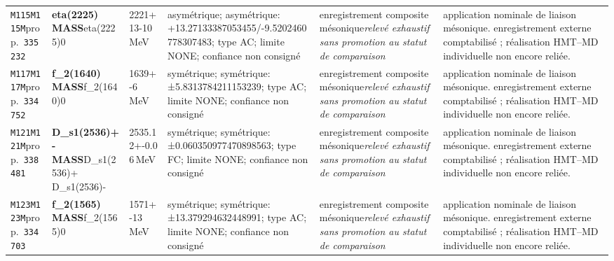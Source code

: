 \begin{landscape}
\begin{longtable}{L{1.85cm}L{4.45cm}L{2.35cm}L{4.05cm}L{3.35cm}L{7.15cm}}
\texttt{M115}\newline \texttt{M115M}\newline prop.\ \texttt{335232} & \textbf{eta(2225) MASS}\newline eta(2225)0 & 2221+13-10\,MeV & asymétrique; asymétrique: +13.27133387053455/-9.5202460778307483; type AC; limite NONE; confiance non consigné & enregistrement composite mésonique\newline \emph{relevé exhaustif sans promotion au statut de comparaison} & application nominale de liaison mésonique. enregistrement externe comptabilisé ; réalisation HMT--MD individuelle non encore reliée. \\
\texttt{M117}\newline \texttt{M117M}\newline prop.\ \texttt{334752} & \textbf{f\_\allowbreak{}2(1640) MASS}\newline f\_\allowbreak{}2(1640)0 & 1639+-6\,MeV & symétrique; symétrique: ±5.8313784211153239; type AC; limite NONE; confiance non consigné & enregistrement composite mésonique\newline \emph{relevé exhaustif sans promotion au statut de comparaison} & application nominale de liaison mésonique. enregistrement externe comptabilisé ; réalisation HMT--MD individuelle non encore reliée. \\
\texttt{M121}\newline \texttt{M121M}\newline prop.\ \texttt{338481} & \textbf{D\_\allowbreak{}s1(2536)+- MASS}\newline D\_\allowbreak{}s1(2536)+ \textbar{}\allowbreak{} D\_\allowbreak{}s1(2536)- & 2535.12+-0.06\,MeV & symétrique; symétrique: ±0.060350977470898563; type FC; limite NONE; confiance non consigné & enregistrement composite mésonique\newline \emph{relevé exhaustif sans promotion au statut de comparaison} & application nominale de liaison mésonique. enregistrement externe comptabilisé ; réalisation HMT--MD individuelle non encore reliée. \\
\texttt{M123}\newline \texttt{M123M}\newline prop.\ \texttt{334703} & \textbf{f\_\allowbreak{}2(1565) MASS}\newline f\_\allowbreak{}2(1565)0 & 1571+-13\,MeV & symétrique; symétrique: ±13.379294632448991; type AC; limite NONE; confiance non consigné & enregistrement composite mésonique\newline \emph{relevé exhaustif sans promotion au statut de comparaison} & application nominale de liaison mésonique. enregistrement externe comptabilisé ; réalisation HMT--MD individuelle non encore reliée. \\

\end{longtable}
\end{landscape}
